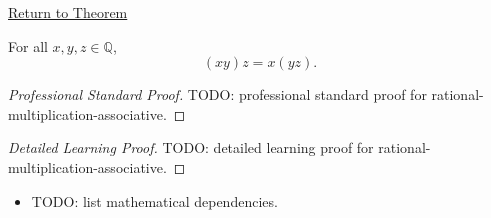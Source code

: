 \newpage
{}
\label{prf:rational-multiplication-associative}

\begin{remark*}[Return]
\hyperref[thm:rational-multiplication-associative]{Return to Theorem}
\end{remark*}

\begin{theorem*}
For all $x,y,z\in\mathbb{Q}$,
\[
(xy)z=x(yz).
\]
\end{theorem*}

\begin{proof}[Professional Standard Proof]
\LRAProofBodyStart
TODO: professional standard proof for rational-multiplication-associative.
\end{proof}

\begin{proof}[Detailed Learning Proof]
\LRAProofBodyStart
TODO: detailed learning proof for rational-multiplication-associative.
\end{proof}

\begin{remark*}
\end{remark*}

\begin{dependencies}
\begin{itemize}
  \item TODO: list mathematical dependencies.
\end{itemize}
\end{dependencies}

\clearpage
